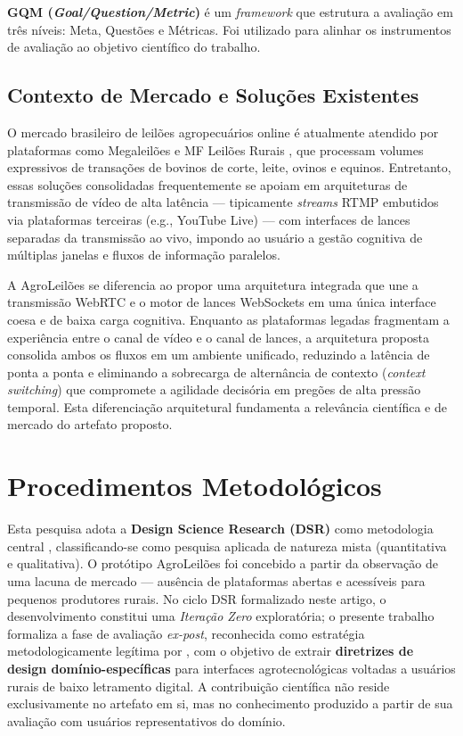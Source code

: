 \documentclass[12pt]{article}
\begin{document}
\textbf{GQM (\textit{Goal/Question/Metric})} \cite{basili1984} é um \textit{framework}
que estrutura a avaliação em três níveis: Meta, Questões e Métricas. Foi utilizado para
alinhar os instrumentos de avaliação ao objetivo científico do trabalho.

\subsection{Contexto de Mercado e Soluções Existentes}

O mercado brasileiro de leilões agropecuários online é atualmente atendido por plataformas
como Megaleilões e MF Leilões Rurais \cite{mfleiloes2024}, que processam volumes expressivos
de transações de bovinos de corte, leite, ovinos e equinos. Entretanto, essas soluções
consolidadas frequentemente se apoiam em arquiteturas de transmissão de vídeo de alta
latência --- tipicamente \textit{streams} RTMP embutidos via plataformas terceiras (e.g.,
YouTube Live) --- com interfaces de lances separadas da transmissão ao vivo, impondo
ao usuário a gestão cognitiva de múltiplas janelas e fluxos de informação paralelos.

A AgroLeilões se diferencia ao propor uma arquitetura integrada que une a transmissão
WebRTC e o motor de lances WebSockets em uma única interface coesa e de baixa carga
cognitiva. Enquanto as plataformas legadas fragmentam a experiência entre o canal de vídeo
e o canal de lances, a arquitetura proposta consolida ambos os fluxos em um ambiente
unificado, reduzindo a latência de ponta a ponta e eliminando a sobrecarga de alternância
de contexto (\textit{context switching}) que compromete a agilidade decisória em pregões
de alta pressão temporal. Esta diferenciação arquitetural fundamenta a relevância científica
e de mercado do artefato proposto.

\section{Procedimentos Metodológicos}
\label{sec:metodologia}

Esta pesquisa adota a \textbf{Design Science Research (DSR)} como metodologia central
\cite{hevner2004,peffers2007}, classificando-se como pesquisa aplicada de natureza mista
(quantitativa e qualitativa). O protótipo AgroLeilões foi concebido a partir da
observação de uma lacuna de mercado — ausência de plataformas abertas e acessíveis para
pequenos produtores rurais. No ciclo DSR formalizado neste artigo, o desenvolvimento
constitui uma \textit{Iteração Zero} exploratória; o presente trabalho formaliza a fase
de avaliação \textit{ex-post}, reconhecida como estratégia metodologicamente legítima por
\cite{venable2012}, com o objetivo de extrair \textbf{diretrizes de design domínio-específicas}
para interfaces agrotecnológicas voltadas a usuários rurais de baixo letramento digital.
A contribuição científica não reside exclusivamente no artefato em si, mas no
conhecimento produzido a partir de sua avaliação com usuários representativos do domínio.
\end{document}
